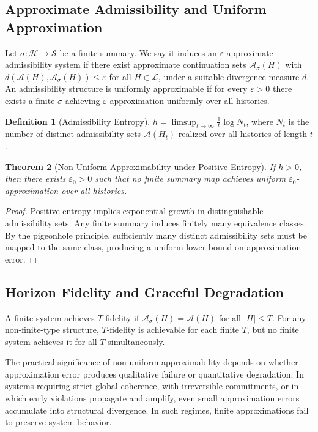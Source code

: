 \documentclass[12pt, a4paper]{article}
\theoremstyle{plain}
\newtheorem{theorem}{Theorem}[section]
\theoremstyle{definition}
\newtheorem{definition}[theorem]{Definition}
\theoremstyle{remark}
\begin{document}
\subsection{Approximate Admissibility and Uniform Approximation}

Let $\sigma : \mathcal{H} \to \mathcal{S}$ be a finite summary. We say it induces an $\varepsilon$-approximate admissibility system if there exist approximate continuation sets $\mathcal{A}_\sigma(H)$ with $d(\mathcal{A}(H), \mathcal{A}_\sigma(H)) \le \varepsilon$ for all $H \in \mathcal{L}$, under a suitable divergence measure $d$. An admissibility structure is uniformly approximable if for every $\varepsilon > 0$ there exists a finite $\sigma$ achieving $\varepsilon$-approximation uniformly over all histories.

\begin{definition}[Admissibility Entropy]
$h = \limsup_{t \to \infty} \frac{1}{t} \log N_t$, where $N_t$ is the number of distinct admissibility sets $\mathcal{A}(H_t)$ realized over all histories of length $t$.
\end{definition}

\begin{theorem}[Non-Uniform Approximability under Positive Entropy]
If $h > 0$, then there exists $\varepsilon_0 > 0$ such that no finite summary map achieves uniform $\varepsilon_0$-approximation over all histories.
\end{theorem}

\begin{proof}
Positive entropy implies exponential growth in distinguishable admissibility sets. Any finite summary induces finitely many equivalence classes. By the pigeonhole principle, sufficiently many distinct admissibility sets must be mapped to the same class, producing a uniform lower bound on approximation error.
\end{proof}

\subsection{Horizon Fidelity and Graceful Degradation}

A finite system achieves $T$-fidelity if $\mathcal{A}_\sigma(H) = \mathcal{A}(H)$ for all $|H| \le T$. For any non-finite-type structure, $T$-fidelity is achievable for each finite $T$, but no finite system achieves it for all $T$ simultaneously.

The practical significance of non-uniform approximability depends on whether approximation error produces qualitative failure or quantitative degradation. In systems requiring strict global coherence, with irreversible commitments, or in which early violations propagate and amplify, even small approximation errors accumulate into structural divergence. In such regimes, finite approximations fail to preserve system behavior.
\end{document}
